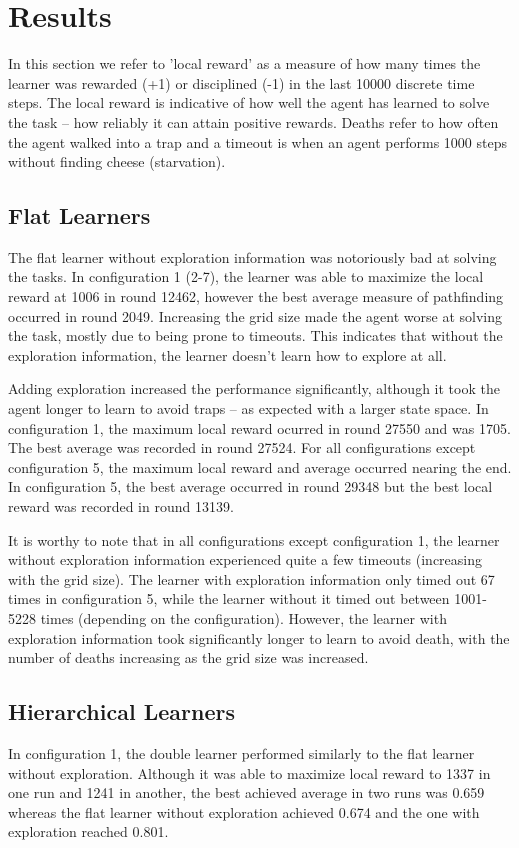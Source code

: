 \documentclass{article}
\begin{document}
	\section{Results}
	\label{sec:results}
	In this section we refer to 'local reward' as a measure of how many times the learner was rewarded (+1) or disciplined (-1) in the last 10000 discrete time steps. The local reward is indicative of how well the agent has learned to solve the task -- how reliably it can attain positive rewards.
	Deaths refer to how often the agent walked into a trap and a timeout is when an agent performs 1000 steps without finding cheese (starvation).

	\subsection{Flat Learners}
	\label{s:res:flat}
	The flat learner without exploration information was notoriously bad at solving the tasks. In configuration 1 (2-7), the learner was able to maximize the local reward at 1006 in round 12462, however the best average measure of pathfinding occurred in round 2049. Increasing the grid size made the agent worse at solving the task, mostly due to being prone to timeouts. This indicates that without the exploration information, the learner doesn't learn how to explore at all. 

	Adding exploration increased the performance significantly, although it took the agent longer to learn to avoid traps -- as expected with a larger state space. In configuration 1, the maximum local reward ocurred in round 27550 and was 1705. The best average was recorded in round 27524. For all configurations except configuration 5, the maximum local reward and average occurred nearing the end. In configuration 5, the best average occurred in round 29348 but the best local reward was recorded in round 13139.

	It is worthy to note that in all configurations except configuration 1, the learner without exploration information experienced quite a few timeouts (increasing with the grid size). The learner with exploration information only timed out 67 times in configuration 5, while the learner without it timed out between 1001-5228 times (depending on the configuration). However, the learner with exploration information took significantly longer to learn to avoid death, with the number of deaths increasing as the grid size was increased.

	\subsection{Hierarchical Learners}
	\label{s:res:meta}
	In configuration 1, the double learner performed similarly to the flat learner without exploration. Although it was able to maximize local reward to 1337 in one run and 1241 in another, the best achieved average in two runs was 0.659 whereas the flat learner without exploration achieved 0.674 and the one with exploration reached 0.801.
	
\end{document}

